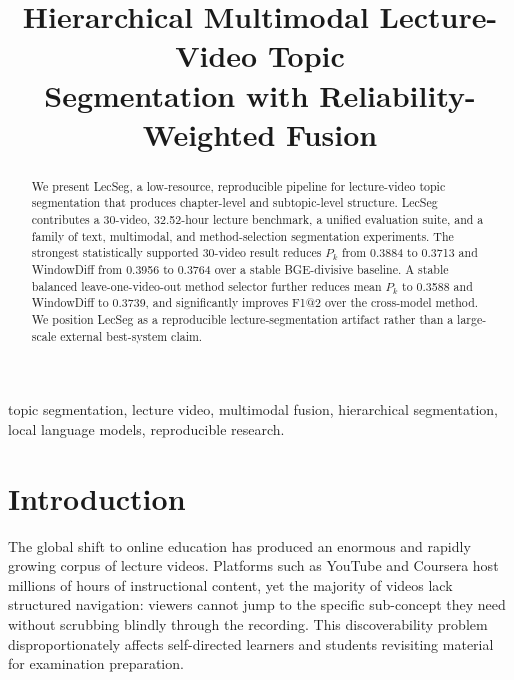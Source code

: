 \documentclass[conference]{IEEEtran}
\newcommand{\lecseg}{LecSeg}
\begin{document}
\title{Hierarchical Multimodal Lecture-Video Topic\\Segmentation with
       Reliability-Weighted Fusion}

\author{
}

\maketitle

\begin{abstract}
We present \lecseg{}, a low-resource, reproducible pipeline for lecture-video
topic segmentation that produces chapter-level and subtopic-level structure.
\lecseg{} contributes a 30-video, 32.52-hour lecture benchmark, a unified
evaluation suite, and a family of text, multimodal, and method-selection
segmentation experiments. The strongest statistically supported 30-video
result reduces $P_k$ from 0.3884 to 0.3713 and WindowDiff from 0.3956 to
0.3764 over a stable BGE-divisive baseline. A stable balanced leave-one-video-out
method selector further reduces mean $P_k$ to 0.3588 and WindowDiff to 0.3739,
and significantly improves F1@2 over the cross-model method. We position
\lecseg{} as a reproducible lecture-segmentation artifact rather than a
large-scale external best-system claim.
\end{abstract}

\begin{IEEEkeywords}
topic segmentation, lecture video, multimodal fusion, hierarchical
segmentation, local language models, reproducible research.
\end{IEEEkeywords}

\section{Introduction}

The global shift to online education has produced an enormous and rapidly
growing corpus of lecture videos. Platforms such as YouTube and Coursera host
millions of hours of instructional content, yet the majority of videos lack
structured navigation: viewers cannot jump to the specific sub-concept they
need without scrubbing blindly through the recording. This discoverability
problem disproportionately affects self-directed learners and students revisiting
material for examination preparation.
\end{document}
